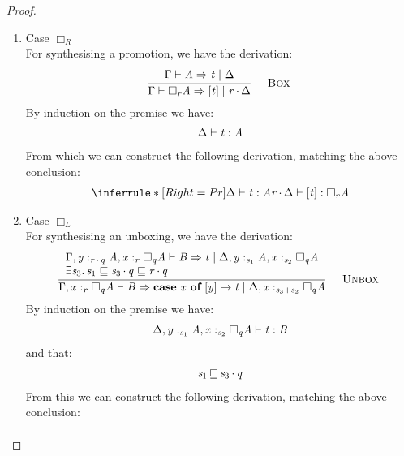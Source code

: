 \begin{proof}
\begin{enumerate}
\item Case $\Box_{R}$ \\
        For synthesising a promotion, we have the derivation:
        \begin{align*}
          \synBox
        \end{align*}
        By induction on the premise we have:
        \begin{align*}
          \Delta  \vdash  \mathit{t}  :  \mathit{A}
        \end{align*}
        From which we can construct the following derivation, matching the above conclusion:
        \begin{align*}
          \inferrule*[Right=Pr]{\Delta  \vdash  \GRANULEnt{t}  :  \GRANULEnt{A}}{ \textcolor{coeffectColor}{ \GRANULEnt{r}   \textcolor{coeffectColor}{\,\cdot\,} }  \Delta   \vdash  \GRANULEsym{[}  \GRANULEnt{t}  \GRANULEsym{]}  :   \Box_{  \GRANULEnt{r}  }  \GRANULEnt{A}}
        \end{align*}
  \item Case $\Box_{L}$ \\
        For synthesising an unboxing, we have the derivation:
        \begin{align*}
          \synUnbox
        \end{align*}
        By induction on the premise we have:
        \begin{align*}
          \Delta  \GRANULEsym{,}   \GRANULEmv{y}  :_{\textcolor{coeffectColor}{  \GRANULEnt{s_{{\mathrm{1}}}}  } }   \GRANULEnt{A}    \GRANULEsym{,}   \GRANULEmv{x}  :_{\textcolor{coeffectColor}{  \GRANULEnt{s_{{\mathrm{2}}}}  } }    \Box_{  \GRANULEnt{q}  }  \GRANULEnt{A}    \vdash  \GRANULEnt{t}  :  \GRANULEnt{B}
        \end{align*}
        and that:
        \begin{align*}
          \GRANULEnt{s_{{\mathrm{1}}}}  \, \textcolor{coeffectColor}{\sqsubseteq} \,   \GRANULEnt{s_{{\mathrm{3}}}}  \textcolor{coeffectColor}{\,\cdot\,}  \GRANULEnt{q}
        \end{align*}
        From this we can construct the following derivation, matching the above conclusion:
        \begin{align*}

\end{align*}
\end{enumerate}
\end{proof}

